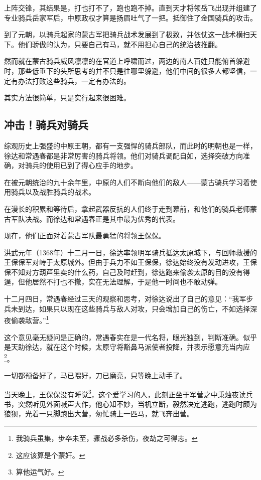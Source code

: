 \begin{multicols}{\theparacolNo}
		上阵交锋，其结果是，打也打不了，跑也跑不掉。直到天才将领岳飞出现并组建了专业骑兵岳家军后，中原政权才算是扬眉吐气了一把。抵御住了金国骑兵的攻击。

		到了元朝，以骑兵起家的蒙古军把骑兵战术发展到了极致，并依仗这一战术横扫天下。他们骄傲的认为，只要自己有马，就不用担心自己的统治被推翻。

		然而就在蒙古骑兵威风凛凛的在官道上呼啸而过，两边的南人百姓只能俯首躲避时，那些低垂下的头所思考的并不只是往哪里躲避，他们中间的很多人都坚信，一定有办法打败这些骑兵，一定有办法的。

		其实方法很简单，只是实行起来很困难。

		\subsection{冲击！骑兵对骑兵}
		综观历史上强盛的中原王朝，都有一支强悍的骑兵部队，而此时的明朝也是一样，徐达和常遇春都是非常厉害的骑兵将领。他们对骑兵调配自如，选择突破方向准确，对骑兵的使用已到了得心应手的地步。

		在被元朝统治的九十余年里，中原的人们不断向他们的敌人——蒙古骑兵学习着使用骑兵以及战胜骑兵的战术。

		在漫长的积累和等待后，拿起武器反抗的人们终于走到幕前，和他们的骑兵老师蒙古军队决战。而徐达和常遇春正是其中最为优秀的代表。

		现在，他们正面对着蒙古军队最勇猛的将领王保保。

		洪武元年（1368年）十二月一日，徐达率领明军骑兵抵达太原城下，与回师救援的王保保军对峙于太原城外。但由于兵力不如王保保，徐达始终没有发动进攻，王保保不知对方葫芦里卖的什么药，自己及时赶到，徐达跑来偷袭太原的目的没有得逞，但他居然不打也不撤，实在无法理解，于是他一时间也不敢动弹。

		十二月四日，常遇春经过三天的观察和思考，对徐达说出了自己的意见：“我军步兵未到达，如果只以现在这些骑兵与敌人对攻，只会增加自己的伤亡，不如选择深夜偷袭敌营。”\footnote{我骑兵虽集，步卒未至，骤战必多杀伤，夜劫之可得志。}

		这个意见毫无疑问是正确的，常遇春实在是一代名将，眼光独到，判断准确。似乎是天助徐达，就在这个时候，太原守将豁鼻马派使者投降，并表示愿意充当内应\footnote{这应该算是个蒙奸。}。

		一切都预备好了，马已喂好，刀已磨亮，只等晚上动手了。

		当天晚上，王保保没有睡觉\footnote{算他运气好。}，这个爱学习的人，此刻正坐于军营之中秉烛夜读兵书，突然听见外面喊声大作，他心知不妙，当机立断，毅然决定逃跑，逃跑时颇为狼狈，光着一只脚跑出大营，匆忙骑上一匹马，就飞奔出营。


\end{multicols}
